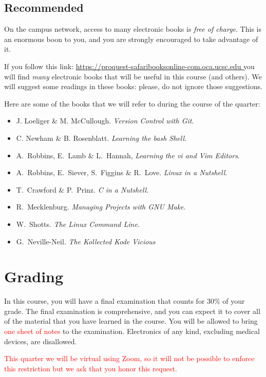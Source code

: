 \documentclass{article}
\begin{document}
\subsection{Recommended}
On the campus network, access to many electronic books is \emph{free of
charge}. This is an enormous boon to you, and you are strongly encouraged to
take advantage of it.

If you follow this link:
\url{https://proquest-safaribooksonline-com.oca.ucsc.edu }
you will find \emph{many} electronic books that will be useful in
this course (and others). We will suggest some readings in these
books: please, do not ignore those suggestions.

Here are some of the books that we will refer to during the course of the
quarter:
\begin{itemize}
  \item J.\xspace Loeliger \& M.\xspace McCullough. \emph{Version Control with
    Git}.
  \item C.\xspace Newham \& B.\xspace Rosenblatt. \emph{Learning the bash
    Shell}.
  \item A.\ Robbins, E.\ Lamb \& L.\ Hannah, \emph{Learning the vi and Vim
    Editors}.
  \item A.\ Robbins, E.\ Siever, S.\ Figgins \& R.\ Love. \emph{Linux in a
    Nutshell}.
  \item T.\ Crawford \& P.\ Prinz. \emph{C in a Nutshell}.
  \item R.\ Mecklenburg. \emph{Managing Projects with GNU Make}.
  \item W.\ Shotts. \emph{The Linux Command Line}.
  \item G.\ Neville-Neil. \emph{The Kollected Kode Vicious}
\end{itemize}

\section{Grading}
In this course, you will have a final examination that counts for 30\% of your
grade. The final examination is comprehensive, and you can expect it to cover
all of the material that you have learned in the course. You will be allowed
to bring \textcolor{red}{one sheet of notes} to the examination. Electronics
of any kind, excluding medical devices, are disallowed.

\textcolor{red}{This quarter we will be virtual using Zoom, so it will not be possible to enforce
this restriction but we ask that you honor this request.}
\end{document}
